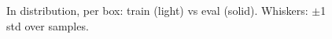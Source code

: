 \begin{figure}[t]
\centering

\caption{In distribution, per box: train (light) vs eval (solid). Whiskers: $\pm$1 std over samples.}
\label{fig:box_train_eval}
\end{figure}
